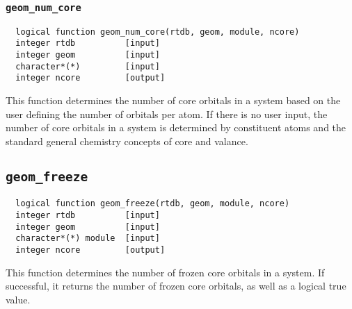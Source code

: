 \subsubsection{{\tt geom\_num\_core}}
\begin{verbatim}
  logical function geom_num_core(rtdb, geom, module, ncore)
  integer rtdb          [input]
  integer geom          [input]
  character*(*)         [input]
  integer ncore         [output]
\end{verbatim}
This function determines the number of core orbitals in a system based on the user defining
the number of orbitals per atom.  If there is no user input, the number of core orbitals in a system
is determined by constituent atoms and the standard general chemistry concepts of core and
valance.

\subsection{{\tt geom\_freeze}}
\begin{verbatim}
  logical function geom_freeze(rtdb, geom, module, ncore)
  integer rtdb          [input]
  integer geom          [input]
  character*(*) module  [input]
  integer ncore         [output]
\end{verbatim}
This function determines the number of frozen core orbitals in a system.  If successful,
it returns the number of frozen core orbitals, as well as a logical true value.

